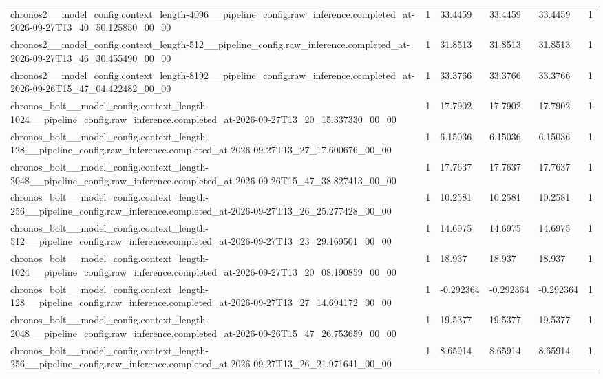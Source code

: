 \begin{tabular}{llllll}
chronos2\_\_model\_config.context\_length-4096\_\_pipeline\_config.raw\_inference.completed\_at-2026-09-27T13\_40\_50.125850\_00\_00 & 1 & 33.4459 & 33.4459 & 33.4459 & 1 \\
chronos2\_\_model\_config.context\_length-512\_\_pipeline\_config.raw\_inference.completed\_at-2026-09-27T13\_46\_30.455490\_00\_00 & 1 & 31.8513 & 31.8513 & 31.8513 & 1 \\
chronos2\_\_model\_config.context\_length-8192\_\_pipeline\_config.raw\_inference.completed\_at-2026-09-26T15\_47\_04.422482\_00\_00 & 1 & 33.3766 & 33.3766 & 33.3766 & 1 \\
chronos\_bolt\_\_model\_config.context\_length-1024\_\_pipeline\_config.raw\_inference.completed\_at-2026-09-27T13\_20\_15.337330\_00\_00 & 1 & 17.7902 & 17.7902 & 17.7902 & 1 \\
chronos\_bolt\_\_model\_config.context\_length-128\_\_pipeline\_config.raw\_inference.completed\_at-2026-09-27T13\_27\_17.600676\_00\_00 & 1 & 6.15036 & 6.15036 & 6.15036 & 1 \\
chronos\_bolt\_\_model\_config.context\_length-2048\_\_pipeline\_config.raw\_inference.completed\_at-2026-09-26T15\_47\_38.827413\_00\_00 & 1 & 17.7637 & 17.7637 & 17.7637 & 1 \\
chronos\_bolt\_\_model\_config.context\_length-256\_\_pipeline\_config.raw\_inference.completed\_at-2026-09-27T13\_26\_25.277428\_00\_00 & 1 & 10.2581 & 10.2581 & 10.2581 & 1 \\
chronos\_bolt\_\_model\_config.context\_length-512\_\_pipeline\_config.raw\_inference.completed\_at-2026-09-27T13\_23\_29.169501\_00\_00 & 1 & 14.6975 & 14.6975 & 14.6975 & 1 \\
chronos\_bolt\_\_model\_config.context\_length-1024\_\_pipeline\_config.raw\_inference.completed\_at-2026-09-27T13\_20\_08.190859\_00\_00 & 1 & 18.937 & 18.937 & 18.937 & 1 \\
chronos\_bolt\_\_model\_config.context\_length-128\_\_pipeline\_config.raw\_inference.completed\_at-2026-09-27T13\_27\_14.694172\_00\_00 & 1 & -0.292364 & -0.292364 & -0.292364 & 1 \\
chronos\_bolt\_\_model\_config.context\_length-2048\_\_pipeline\_config.raw\_inference.completed\_at-2026-09-26T15\_47\_26.753659\_00\_00 & 1 & 19.5377 & 19.5377 & 19.5377 & 1 \\
chronos\_bolt\_\_model\_config.context\_length-256\_\_pipeline\_config.raw\_inference.completed\_at-2026-09-27T13\_26\_21.971641\_00\_00 & 1 & 8.65914 & 8.65914 & 8.65914 & 1 \\

\end{tabular}
